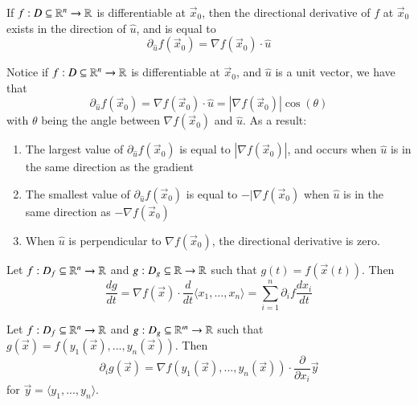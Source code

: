 \documentclass[12pt, a4paper, oneside, openright, titlepage]{book}
\begin{document}
\begin{appendices}
    \begin{thm}
        If $f:D\subseteq \mathbb R^n\rightarrow \mathbb R$ is differentiable at $\vec{x}_0$, then the directional derivative of $f$ at $\vec{x}_0$ exists in the direction of $\hat{u}$, and is equal to \begin{equation}
            \partial_{\hat{u}}f(\vec{x}_0) = \nabla f(\vec{x}_0) \cdot \hat{u}
        \end{equation}
    \end{thm}


    \begin{thm}
        Notice if $f:D\subseteq \mathbb R^n\rightarrow \mathbb R$ is differentiable at $\vec{x}_0$, and $\hat{u}$ is a unit vector, we have that \begin{equation}
            \partial_{\hat{u}}f(\vec{x}_0) = \nabla f(\vec{x}_0) \cdot \hat{u} = |\nabla f(\vec{x}_0)|\cos(\theta)
        \end{equation}
        with $\theta$ being the angle between $\nabla f(\vec{x}_0)$ and $\hat{u}$. As a result: \begin{enumerate}
            \item The largest value of $\partial_{\hat{u}}f(\vec{x}_0)$ is equal to $|\nabla f(\vec{x}_0)|$, and occurs when $\hat{u}$ is in the same direction as the gradient
            \item The smallest value of $\partial_{\hat{u}}f(\vec{x}_0)$ is equal to $-|\nabla f(\vec{x}_0)$ when $\hat{u}$ is in the same direction as $-\nabla f(\vec{x}_0)$
            \item When $\hat{u}$ is perpendicular to $\nabla f(\vec{x}_0)$, the directional derivative is zero.
        \end{enumerate}
    \end{thm}

    \begin{thm}
        Let $f:D_f\subseteq \mathbb R^n\rightarrow \mathbb R$ and $g:D_g\subseteq \mathbb R\rightarrow \mathbb R$ such that $g(t) = f(\vec{x}(t))$. Then \begin{equation}
            \frac{dg}{dt} = \nabla f(\vec{x}) \cdot \frac{d}{dt}\langle x_1,...,x_n\rangle = \sum_{i=1}^n \partial_i f\frac{dx_i}{dt}
        \end{equation}
    \end{thm}

    \begin{thm}
        Let $f:D_f\subseteq \mathbb R^n\rightarrow \mathbb R$ and $g:D_g\subseteq \mathbb R^m\rightarrow \mathbb R$ such that $g(\vec{x}) = f(y_1(\vec{x}),...,y_n(\vec{x}))$. Then \begin{equation}
        \partial_i g(\vec{x}) = \nabla f(y_1(\vec{x}),...,y_n(\vec{x})) \cdot \frac{\partial}{\partial x_i}\vec{y}
        \end{equation}
        for $\vec{y} = \langle y_1,...,y_n\rangle$.
    \end{thm}



\end{appendices}
\end{document}

